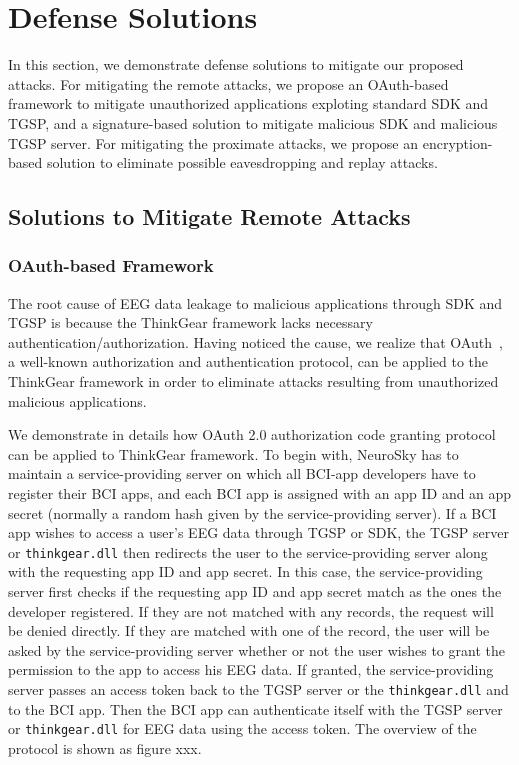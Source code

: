 \section{Defense Solutions}
\label{sec:defense}

In this section, we demonstrate defense solutions to mitigate our proposed attacks. For mitigating the remote attacks, we propose an OAuth-based framework to mitigate unauthorized applications exploting standard SDK and TGSP, and a signature-based solution to mitigate malicious SDK and malicious TGSP server. For mitigating the proximate attacks, we propose an encryption-based solution to eliminate possible eavesdropping and replay attacks.

\subsection{Solutions to Mitigate Remote Attacks}

\subsubsection{OAuth-based Framework}
The root cause of EEG data leakage to malicious applications through SDK and TGSP is because the ThinkGear framework lacks necessary authentication/authorization. Having noticed the cause, we realize that OAuth~\cite{hardt2012oauth}, a well-known authorization and authentication protocol, can be applied to the ThinkGear framework in order to eliminate attacks resulting from unauthorized malicious applications.

We demonstrate in details how OAuth 2.0 authorization code granting protocol can be applied to ThinkGear framework. To begin with, NeuroSky has to maintain a service-providing server on which all BCI-app developers have to register their BCI apps, and each BCI app is assigned with an app ID and an app secret (normally a random hash given by the service-providing server). If a BCI app wishes to access a user's EEG data through TGSP or SDK, the TGSP server or \texttt{thinkgear.dll} then redirects the user to the service-providing server along with the requesting app ID and app secret. In this case, the service-providing server first checks if the requesting app ID and app secret match as the ones the developer registered. If they are not matched with any records, the request will be denied directly. If they are matched with one of the record, the user will be asked by the service-providing server whether or not the user wishes to grant the permission to the app to access his EEG data. If granted, the service-providing server passes an access token back to the TGSP server or the \texttt{thinkgear.dll} and to the BCI app. Then the BCI app can authenticate itself with the TGSP server or \texttt{thinkgear.dll} for EEG data using the access token. The overview of the protocol is shown as figure xxx.

